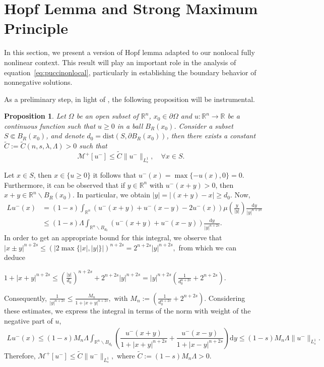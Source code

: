 \documentclass[11pt]{article}
\newtheorem{proposition}{Proposition}
\begin{document}


\section{Hopf Lemma and Strong Maximum Principle}


In this section, we present a version of Hopf lemma adapted to our nonlocal fully nonlinear context. This result will play an important role in the analysis of equation~\eqref{eq:puccinonlocal}, particularly in establishing the boundary behavior of nonnegative solutions. 

As a preliminary step, in light of \cite{dipierro2024fractional}, the following proposition will be instrumental.
\begin{proposition}\label{lema2}
    Let \(\Omega\) be an open subset of \(\mathbb{R}^{n}\), \(x_0\in\partial\Omega\) and \(u:\mathbb{R}^{n}\to\mathbb{R}\) be a continuous function such that \(u\geq 0\) in a ball \(B_{R}(x_0)\). Consider a subset \(S\Subset B_{R}(x_0)\), and denote \(d_0 = \mathrm{dist}(S, \partial B_{R}(x_0))\), then there exists a constant \(\widetilde{C}:=\widetilde{C}(n,s,\lambda,\Lambda)>0\) such that \[\mathcal{M}^{+}[u^{-}] \leq \widetilde{C}\|u^{-}\|_{L^{1}_{s}},\quad\forall x\in S.\]
\end{proposition}

\proof Let \(x\in S\), then \(x\in\{u \geq 0\}\) it follows that \(u^{-}(x) = \max\{-u(x),0\} = 0\). Furthermore, it can be observed that if \(y\in\mathbb{R}^{n}\) with \(u^{-}(x+y)>0\), then \(x+y\in\mathbb{R}^{n}\backslash B_{R}(x_0)\). In particular, we obtain \(|y| = |(x+y)-x|\geq d_0\). Now,
\begin{align*}
  Lu^{-}(x) &= (1-s)\int_{\mathbb{R}^{n}}
    ( {u^{-}(x+y) + u^{-}(x-y)} - 2u^{-}(x) )\mu \left(\frac{y}{|y|}\right)\frac{\mathrm{d}y}{|y|^{n+2s}} \\
 &\leq (1-s) 
    \Lambda\int_{\mathbb{R}^{n}\backslash B_{d_0}} 
    ({u^{-}(x+y) + u^{-}(x-y)} )\frac{\mathrm{d}y}{|y|^{n+2s}}.
\end{align*}
In order to get an appropriate bound for this integral, we observe that $|x\pm y|^{n+2s} \leq \left(|2\max\{|x|,|y|\}|\right)^{n+2s}=2^{n+2s}|y|^{n+2s},$ from which we can deduce 
\begin{center}
$1+|x+y|^{n+2s} \leq \left(\frac{|y|}{d_{0}}\right)^{n+2s} + 2^{n+2s}|y|^{n+2s} = |y|^{n+2s}\left(\frac{1}{d_{0}^{n+2s}} + 2^{n+2s}\right).$
\end{center}
Consequently, 
   $ \frac{1}{|y|^{n+2s}} \leq \frac{M_{n}}{1+|x+y|^{n+2s}},$ with $ M_{n}:=\left(\frac{1}{d_{0}^{n+2s}} + 2^{n+2s}\right).$
Considering these estimates, we express the integral in terms of the norm with weight of the negative part of \(u\),
\begin{align*}
 Lu^{-}(x) \leq {(1-s)}M_{n}\Lambda \int_{\mathbb{R}^{n}\backslash B_{d_0}}\left(\dfrac{u^{-}(x+y)}{1+|x+y|^{n+2s}} + \dfrac{u^{-}(x-y)}{1+|x-y|^{n+2s}}\right)\mathrm{d}y \leq {(1-s)}M_{n}\Lambda\|u^{-}\|_{L^{1}_{s}}.
\end{align*}
Therefore, 
$
    \mathcal{M}^{+}[u^{-}] \leq \widetilde{C}\|u^{-}\|_{L^{1}_{s}},
$
where \(\widetilde{C}:= {(1-s)}M_{n}\Lambda>0\).
\endproof
\end{document}
